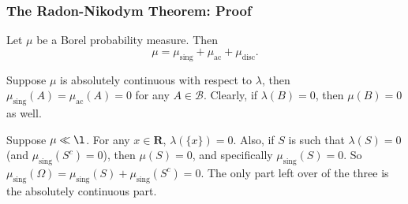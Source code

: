 \documentclass[handout]{beamer}
\begin{document}
\frame
{
\frametitle{The Radon-Nikodym Theorem: Proof} 

Let $\mu$ be a Borel probability measure. Then 
$$
\mu = \mu_{\text{sing}} + \mu_{\text{ac}} + \mu_{\text{disc}}.
$$

Suppose $\mu$ is absolutely continuous with respect to $\lambda$, then $\mu_{\text{sing}}(A) = \mu_{\text{ac}}(A) = 0$ for any $A \in \mathcal{B}$. Clearly, if $\lambda(B) = 0$, then $\mu(B)  = 0$ as well. 
\newline

Suppose $\mu \ll \l$. For any $x \in \mathbf{R}$, $\lambda(\{x\}) = 0$. Also, if $S$ is such that $\lambda(S) = 0$ (and $\mu_{\text{sing}}(S^c) = 0$), then $\mu(S) = 0$, and specifically $\mu_{\text{sing}}(S) = 0$. So $\mu_{\text{sing}}(\Omega) = \mu_{\text{sing}}(S) + \mu_{\text{sing}}(S^c) = 0$. The only part left over of the three is the absolutely continuous part.
}
\end{document}
